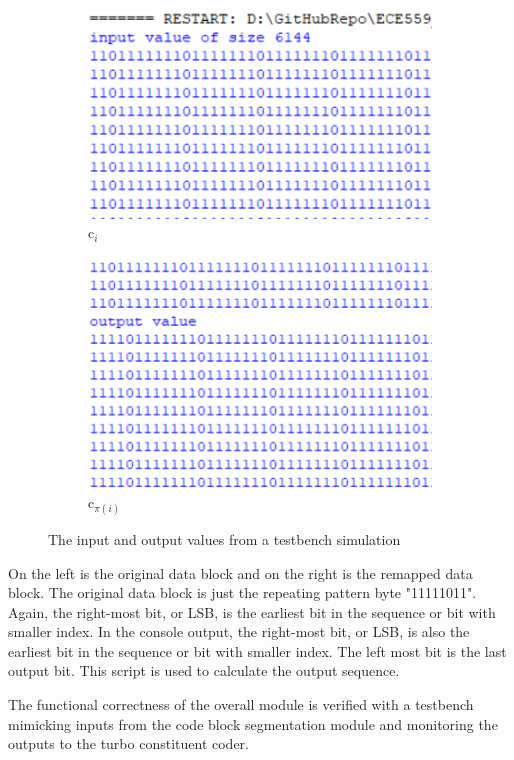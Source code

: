 \documentclass[letterpaper, 12pt]{article} %
\begin{document}
\begin{figure}[ht]
\centering
\begin{subfigure}{.5\textwidth}
  \centering
  \includegraphics[width=0.95\linewidth]{files/ci}
  \caption{c$_i$}
  \label{ci}
\end{subfigure}%
\begin{subfigure}{.5\textwidth}
  \centering
  \includegraphics[width=0.95\linewidth]{files/cpii}
  \caption{c$_{\pi (i)}$}
  \label{cpii}
\end{subfigure}
\caption{The input and output values from a testbench simulation}
\label{fig:tb}
\end{figure}

On the left is the original data block and on the right is the remapped data block. The original data block is just the repeating pattern byte "11111011". Again, the right-most bit, or LSB, is the earliest bit in the sequence or bit with smaller index. In the console output, the right-most bit, or LSB, is also the earliest bit in the sequence or bit with smaller index. The left most bit is the last output bit. This script is used to calculate the output sequence.\par
The functional correctness of the overall module is verified with a testbench mimicking inputs from the code block segmentation module and monitoring the outputs to the turbo constituent coder.\par
\end{document}
